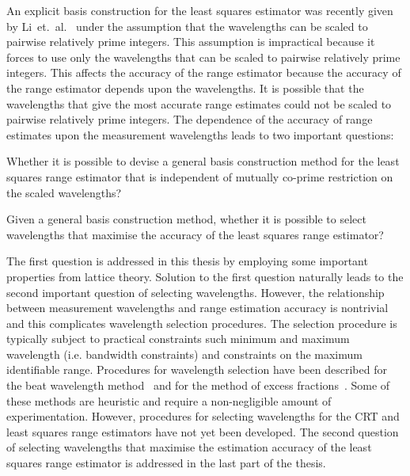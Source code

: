 An explicit basis construction for the least squares estimator was recently given by Li~et.~al.~\cite{Li_distance_est_wrapped_phase} under the assumption that the wavelengths can be scaled to pairwise relatively prime integers. This assumption is impractical because it forces to use only the wavelengths that can be scaled to pairwise relatively prime integers. %
This affects the accuracy of the range estimator because the accuracy of the range estimator depends upon the wavelengths. It is possible that the wavelengths that give the most accurate range estimates could not be scaled to pairwise relatively prime integers. The dependence of the accuracy of range estimates upon the measurement wavelengths leads to two important questions:
\begin{itemise}
\item{Whether it is possible to devise a general basis construction method for the least squares range estimator that is independent of mutually co-prime restriction on the scaled wavelengths?}
\item{Given a general basis construction method, whether it is possible to select wavelengths that maximise the accuracy of the least squares range estimator?}
\end{itemise}
The first question is addressed in this thesis by employing some important properties from lattice theory. Solution to the first question naturally leads to the second important question of selecting wavelengths.
However, the relationship between measurement wavelengths and range estimation accuracy is nontrivial and this complicates wavelength selection procedures. The selection procedure is typically subject to practical constraints such minimum and maximum wavelength (i.e. bandwidth constraints) and constraints on the maximum identifiable range. Procedures for wavelength selection have been described for the beat wavelength method~\cite{Towers_frequency_selection_interferometry_2003} and for the method of excess fractions~\cite{Falaggis_excess_fractions_2012}.  Some of these methods are heuristic and require a non-negligible amount of experimentation.  However, procedures for selecting wavelengths for the CRT and least squares range estimators have not yet been developed. The second question of selecting wavelengths that maximise the estimation accuracy of the least squares range estimator is addressed in the last part of the thesis.

